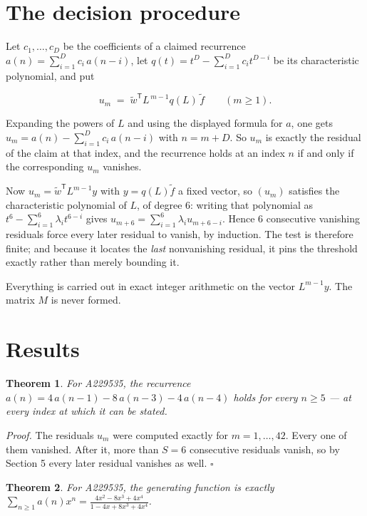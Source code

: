 \documentclass[11pt]{article}
\newtheorem{theorem}{Theorem}
\theoremstyle{definition}
\begin{document}
\section{The decision procedure}

Let $c_1,\dots,c_D$ be the coefficients of a claimed recurrence $a(n) = \sum_{i=1}^{D} c_i\,a(n-i)$, let $q(t) = t^{D} - \sum_{i=1}^{D} c_i t^{D-i}$ be its characteristic polynomial, and put

\[u_m \;=\; \tilde w^{\mathsf T} L^{\,m-1} q(L)\,\tilde f \qquad (m \ge 1).\]

Expanding the powers of $L$ and using the displayed formula for $a$, one gets $u_m = a(n) - \sum_{i=1}^{D} c_i\,a(n-i)$ with $n = m + D$. So $u_m$ is exactly the residual of the claim at that index, and the recurrence holds at an index $n$ if and only if the corresponding $u_m$ vanishes.

Now $u_m = \tilde w^{\mathsf T} L^{m-1} y$ with $y = q(L)\tilde f$ a fixed vector, so $(u_m)$ satisfies the characteristic polynomial of $L$, of degree $6$: writing that polynomial as $t^{6} - \sum_{i=1}^{6} \lambda_i t^{6-i}$ gives $u_{m+6} = \sum_{i=1}^{6} \lambda_i u_{m+6-i}$. Hence $6$ consecutive vanishing residuals force every later residual to vanish, by induction. The test is therefore finite; and because it locates the {\itshape last} nonvanishing residual, it pins the threshold exactly rather than merely bounding it.

Everything is carried out in exact integer arithmetic on the vector $L^{m-1}y$. The matrix $M$ is never formed.

\section{Results}

\begin{theorem} For A229535, the recurrence $a(n) = 4\,a(n-1) - 8\,a(n-3) - 4\,a(n-4)$ holds for every $n \ge 5$ --- at every index at which it can be stated.\end{theorem}

{\itshape Proof.} The residuals $u_m$ were computed exactly for $m = 1,\dots,42$. Every one of them vanished. After it, more than $S = 6$ consecutive residuals vanish, so by Section 5 every later residual vanishes as well. $\square$

\begin{theorem} For A229535, the generating function is exactly $\sum_{n\ge 1} a(n)x^n = \frac{4x^{2} - 8x^{3} + 4x^{4}}{1 - 4x + 8x^{3} + 4x^{4}}$.\end{theorem}
\end{document}
